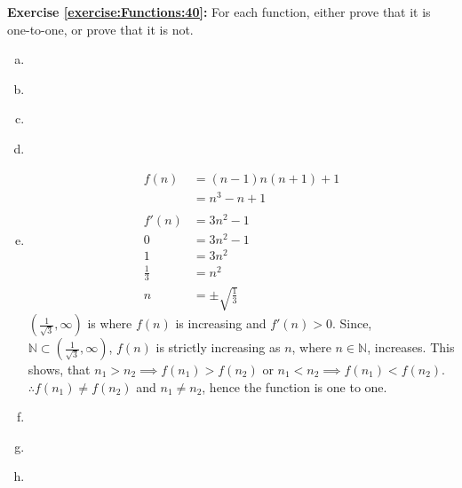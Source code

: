 \noindent\textbf{Exercise \ref{exercise:Functions:40}:} %
For each function, either prove that it is one-to-one, or prove that it is not.
\begin{enumerate}[(a)]
\item \label{IsIt11?-linear}

\item \label{IsIt11?-square0}

\item \label{IsIt11?-square}

\item

\item
\begin{align*}
f(n) &= (n - 1)n(n+1) + 1\\
&= n^3 - n + 1\\
\\
f'(n) &= 3n^2 - 1\\
0 &= 3n^2 -1\\
1 &= 3n^2\\
\frac{1}{3} &= n^2\\
n &= \pm \sqrt{\frac{1}{3}}
\end{align*}
$(\frac{1}{\sqrt{3}}, \infty)$ is where $f(n)$ is increasing and $f'(n) > 0$.  Since, ${\mathbb N} \subset (\frac{1}{\sqrt{3}}, \infty)$, $f(n)$ is strictly increasing as $n$, where $n \in {\mathbb N}$, increases. This shows, that $n_1 > n_2 \implies f(n_1) > f(n_2)$ or $n_1 < n_2 \implies f(n_1) < f(n_2)$.  \\
$\therefore f(n_1) \neq f(n_2)$ and $n_1 \neq n_2$, hence the function is one to one.

\item

\item \label{IsIt11?-abs}

\item \label{modular_g}


\end{enumerate}
